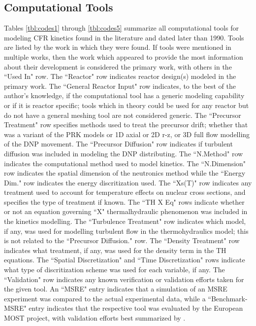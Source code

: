 \documentclass[review]{elsarticle}
\begin{document}
\begin{appendices}

\section{Computational Tools} \label{app:tools}
Tables \ref{tbl:codes1} through \ref{tbl:codes5}
 summarize all computational
tools for modeling CFR kinetics 
found in the literature and dated later than 1990. Tools are listed by the
work in which they were found. If tools were mentioned in multiple works, then
the work which appeared to provide the most information about their development
is considered
the primary work, with others in the ``Used In" row. The
``Reactor" row indicates reactor design(s) modeled in
the primary work. The ``General Reactor Input" row indicates, to the best
of the author's knowledge, if the computational tool has a generic modeling
capability or if it is reactor specific; tools which in theory could be used for
any reactor but do not have a general meshing tool are not considered generic.
The ``Precursor Treatment" row specifies methods used to
treat the precursor drift; whether that was a variant of the PRK models
or 1D axial or 2D r-z, or 3D full flow modelling of the DNP movement.
The ``Precursor Diffusion" row indicates if turbulent diffusion was included in
modeling the DNP distributing.
The ``N.Method" row indicates the computational method used to model
kinetics. The ``N.Dimension" row indicates the spatial dimension of 
the neutronics method while the ``Energy Dim." row indicates the energy
discritization used.
The ``Xs(T)" row indicates any treatment used to account for temperature
effects on nuclear cross sections, and specifies the type of treatment if known.
The ``TH X Eq" rows indicate whether or not an equation governing ``X" thermalhydraulic
phenomenon was
included in the kinetics modelling.
The ``Turbulence Treatment" row 
indicates which model, if any, was used for modelling turbulent flow in the
thermohydraulics model; this is not related to the ``Precursor Diffusion." row.
The ``Density Treatment" row indicates what treatment, if any, was used for the
density term in the TH equations. The ``Spatial Discretization" and ``Time
Discretization" rows indicate what type of discritization scheme was
used for each variable, if any. The ``Validation" row indicates any known
verification
or validation efforts taken for the given tool. An ``MSRE" entry indicates
that a simulation of an MSRE experiment was compared to the actual experimental
data, while a ``Benchmark-MSRE" entry indicates that the respective tool was
evaluated by the European MOST project, with validation efforts best
summarized by \cite{delpech_benchmark_2003}.


\end{appendices}
\end{document}
